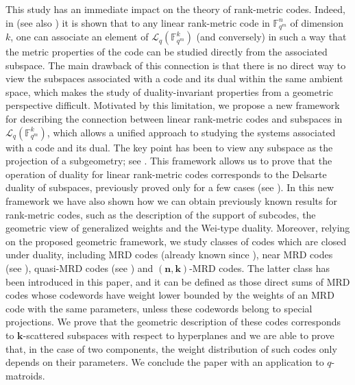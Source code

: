 \documentclass[11pt]{amsart}
\newcommand{\F}{{\mathbb F}}
\begin{document}
This study has an immediate impact on the theory of rank-metric codes. Indeed, in \cite{Randrianarisoa2020ageometric} (see also \cite{alfarano2021linearcutting,sheekey2019scatterd}) it is shown that to any linear rank-metric code in $\F_{q^m}^n$ of dimension $k$, one can associate an element of $\mathcal{L}_q(\F_{q^m}^k)$ (and conversely) in such a way that the metric properties of the code can be studied directly from the associated subspace.
The main drawback of this connection is that there is no direct way to view the subspaces associated with a code and its dual within the same ambient space, which makes the study of duality-invariant properties from a geometric perspective difficult. Motivated by this limitation, we propose a new framework for describing the connection between linear rank-metric codes and subspaces in $\mathcal{L}_q(\F_{q^m}^k)$, which allows a unified approach to studying the systems associated with a code and its dual. The key point has been to view any subspace as the projection of a subgeometry; see \cite{lunardon2004translation}.
This framework allows us to prove that the operation of duality for linear rank-metric codes corresponds to the Delsarte duality of subspaces, previously proved only for a few cases (see \cite{csajbok2021generalising}).
In this new framework we have also shown how we can obtain previously known results for rank-metric codes, such as the description of the support of subcodes, the geometric view of generalized weights and the Wei-type duality.
Moreover, relying on the proposed geometric framework, we study classes of codes which are closed under duality, including MRD codes (already known since \cite{de78,ga85a}), near MRD codes (see \cite{marino2023evasive}), quasi-MRD codes (see \cite{marino2023evasive,de2018weight}) and $(\mathbf{n},\mathbf{k})$-MRD codes. The latter class has been introduced in this paper, and it can be defined as those direct sums of MRD codes whose codewords have weight lower bounded by the weights of an MRD code with the same parameters, unless these codewords belong to special projections. We prove that the geometric description of these codes corresponds to $\mathbf{k}$-scattered subspaces with respect to hyperplanes and we are able to prove that, in the case of two components, the weight distribution of such codes only depends on their parameters. We conclude the paper with an application to $q$-matroids. 
\end{document}
